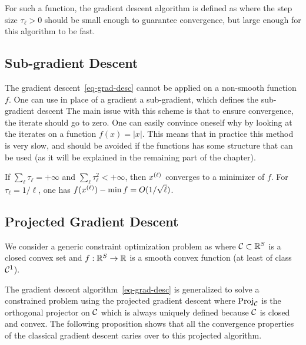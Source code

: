 For such a function, the gradient descent algorithm is defined as
where the step size $\tau_\ell>0$ should be small enough to guarantee convergence, but large enough for this algorithm to be fast.


\subsection{Sub-gradient Descent}

The gradient descent~\eqref{eq-grad-desc} cannot be applied on a non-smooth function $f$. One can use in place of a gradient a sub-gradient, which defines the sub-gradient descent
The main issue with this scheme is that to ensure convergence, the iterate should go to zero. One can easily convince oneself why by looking at the iterates on a function $f(x)=|x|$. This means that in practice this method is very slow, and should be avoided if the functions has some structure that can be used (as it will be explained in the remaining part of the chapter).

\begin{thm}
	If $\sum_{\ell} \tau_\ell=+\infty$ and $\sum_{\ell} \tau_\ell^2 < +\infty$, then $\it{x}$ converges to a minimizer of $f$. For $\tau_\ell=1/\ell$, one has $f(\it{x})-\min f = O(1/\sqrt{\ell})$.
\end{thm}

\subsection{Projected Gradient Descent}
\label{sec-proj-grad}

We consider a generic constraint optimization problem as
where $\Cc \subset \RR^S$ is a closed convex set and $f : \RR^S \rightarrow \RR$ is a smooth convex function (at least of class $\Cc^1$). 

The gradient descent algorithm~\eqref{eq-grad-desc} is generalized to solve a constrained problem using the projected gradient descent 
where $\Proj_\Cc$ is the orthogonal projector on $\Cc$
which is always uniquely defined because $\Cc$ is closed and convex.
%
The following proposition shows that all the convergence properties of the classical gradient descent caries over to this projected algorithm.

